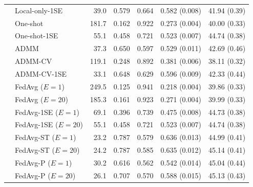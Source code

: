 \begin{longtable}{llrrrrr}
 & Local-only-1SE & 39.0 & 0.579 & 0.664 & 0.582 (0.008) & 41.94 (0.39) \\
 & One-shot & 181.7 & 0.162 & 0.922 & 0.273 (0.004) & 40.00 (0.33) \\
 & One-shot-1SE & 55.1 & 0.458 & 0.721 & 0.523 (0.007) & 44.74 (0.38) \\
 & ADMM & 37.3 & 0.650 & 0.597 & 0.529 (0.011) & 42.69 (0.46) \\
 & ADMM-CV & 119.1 & 0.248 & 0.892 & 0.381 (0.006) & 38.11 (0.32) \\
 & ADMM-CV-1SE & 33.1 & 0.648 & 0.629 & 0.596 (0.009) & 42.33 (0.44) \\
 & FedAvg ($E=1$) & 249.5 & 0.125 & 0.941 & 0.218 (0.004) & 39.86 (0.33) \\
 & FedAvg ($E=20$) & 185.3 & 0.161 & 0.923 & 0.271 (0.004) & 39.99 (0.33) \\
 & FedAvg-1SE ($E=1$) & 69.1 & 0.396 & 0.739 & 0.475 (0.008) & 44.73 (0.38) \\
 & FedAvg-1SE ($E=20$) & 55.1 & 0.458 & 0.721 & 0.523 (0.007) & 44.74 (0.38) \\
 & FedAvg-ST ($E=1$) & 23.2 & 0.787 & 0.579 & 0.636 (0.013) & 44.99 (0.41) \\
 & FedAvg-ST ($E=20$) & 24.2 & 0.787 & 0.585 & 0.635 (0.012) & 45.14 (0.41) \\
 & FedAvg-P ($E=1$) & 30.2 & 0.616 & 0.562 & 0.542 (0.014) & 45.04 (0.44) \\
 & FedAvg-P ($E=20$) & 26.1 & 0.707 & 0.570 & 0.588 (0.015) & 45.13 (0.43) \\
\end{longtable}\endgroup
